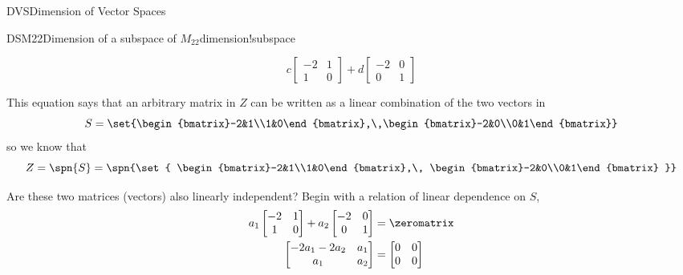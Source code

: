 \begin{subsect}{DVS}{Dimension of Vector Spaces}
\begin{example}{DSM22}{Dimension of a subspace of $M_{22}$}{dimension!subspace}
\begin{para}
\begin{equation*}
%
c\begin{bmatrix}-2&1\\1&0\end{bmatrix}+
d\begin{bmatrix}-2&0\\0&1\end{bmatrix}
%
\end{equation*}
\end{para}
%
\begin{para}This equation says that an arbitrary matrix in $Z$ can be written as a linear combination of the two vectors in
%
\begin{equation*}
S=\set{\begin{bmatrix}-2&1\\1&0\end{bmatrix},\,\begin{bmatrix}-2&0\\0&1\end{bmatrix}}
\end{equation*}
%
so we know that
%
\begin{equation*}
Z=\spn{S}=
\spn{\set{
\begin{bmatrix}-2&1\\1&0\end{bmatrix},\,
\begin{bmatrix}-2&0\\0&1\end{bmatrix}
}}
\end{equation*}
\end{para}
%
\begin{para}Are these two matrices (vectors) also linearly independent?  Begin with a relation of linear dependence on $S$,
%
\begin{align*}
a_1\begin{bmatrix}-2&1\\1&0\end{bmatrix}+
a_2\begin{bmatrix}-2&0\\0&1\end{bmatrix}&=\zeromatrix\\
\begin{bmatrix}-2a_1-2a_2&a_1\\a_1&a_2\end{bmatrix}&=
\begin{bmatrix}0&0\\0&0\end{bmatrix}
\end{align*}
\end{para}

\end{example}
\end{subsect}
